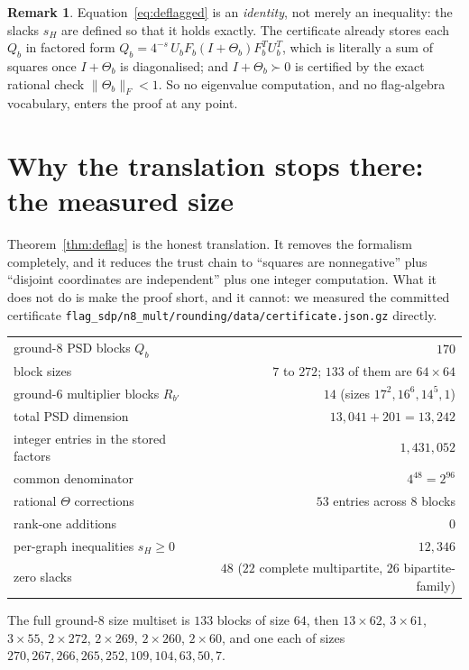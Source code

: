 \documentclass[11pt]{article}
\theoremstyle{definition}
\newtheorem{remark}[theorem]{Remark}
\begin{document}
\begin{remark}
Equation~\eqref{eq:deflagged} is an \emph{identity}, not merely an inequality:
the slacks $s_H$ are defined so that it holds exactly.  The certificate already
stores each $Q_b$ in factored form $Q_b=4^{-s}\,U_bF_b(I+\Theta_b)F_b^{T}U_b^{T}$,
which is literally a sum of squares once $I+\Theta_b$ is diagonalised; and
$I+\Theta_b\succ0$ is certified by the exact rational check
$\|\Theta_b\|_F<1$.  So no eigenvalue computation, and no flag-algebra
vocabulary, enters the proof at any point.
\end{remark}

\section{Why the translation stops there: the measured size}\label{sec:size}

Theorem~\ref{thm:deflag} is the honest translation.  It removes the formalism
completely, and it reduces the trust chain to ``squares are nonnegative'' plus
``disjoint coordinates are independent'' plus one integer computation.  What it
does not do is make the proof short, and it cannot: we measured the committed
certificate \texttt{flag\_sdp/n8\_mult/rounding/data/certificate.json.gz}
directly.

\begin{center}
\begin{tabular}{lr}
\toprule
ground-$8$ PSD blocks $Q_b$ & $170$\\
\quad block sizes & $7$ to $272$; $133$ of them are $64\times64$\\
ground-$6$ multiplier blocks $R_{b'}$ & $14$ (sizes $17^2,16^6,14^5,1$)\\
total PSD dimension & $13{,}041+201=13{,}242$\\
integer entries in the stored factors & $1{,}431{,}052$\\
common denominator & $4^{48}=2^{96}$\\
rational $\Theta$ corrections & $53$ entries across $8$ blocks\\
rank-one additions & $0$\\
per-graph inequalities $s_H\ge0$ & $12{,}346$\\
zero slacks & $48$ ($22$ complete multipartite, $26$ bipartite-family)\\
\bottomrule
\end{tabular}
\end{center}

The full ground-$8$ size multiset is $133$ blocks of size $64$, then
$13{\times}62$, $3{\times}61$, $3{\times}55$, $2{\times}272$, $2{\times}269$,
$2{\times}260$, $2{\times}60$, and one each of sizes
$270,267,266,265,252,109,104,63,50,7$.
\end{document}
